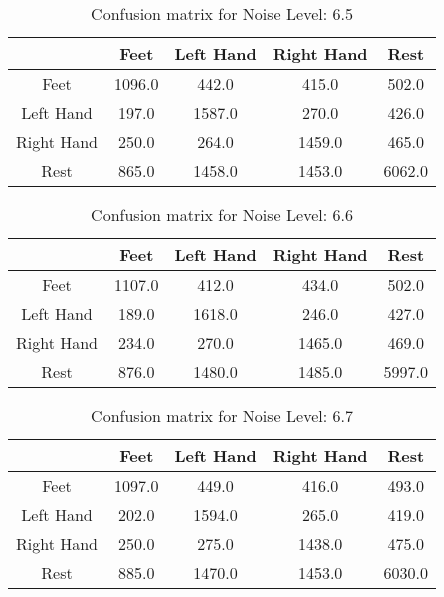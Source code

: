 \begin{table}[!htbp]
    \centering
    \begin{tabular}{|c||c|c|c|c|}
        \hline
		 & Feet & Left Hand & Right Hand & Rest \\
        \hline
        \hline
        Feet & 1096.0 & 442.0 & 415.0 & 502.0 \\
        \hline
        Left Hand & 197.0 & 1587.0 & 270.0 & 426.0 \\
        \hline
        Right Hand & 250.0 & 264.0 & 1459.0 & 465.0 \\
        \hline
        Rest & 865.0 & 1458.0 & 1453.0 & 6062.0 \\
        \hline
    \end{tabular}
    \caption{Confusion matrix for Noise Level: 6.5}
\end{table}

\begin{table}[!htbp]
    \centering
    \begin{tabular}{|c||c|c|c|c|}
        \hline
		 & Feet & Left Hand & Right Hand & Rest \\
        \hline
        \hline
        Feet & 1107.0 & 412.0 & 434.0 & 502.0 \\
        \hline
        Left Hand & 189.0 & 1618.0 & 246.0 & 427.0 \\
        \hline
        Right Hand & 234.0 & 270.0 & 1465.0 & 469.0 \\
        \hline
        Rest & 876.0 & 1480.0 & 1485.0 & 5997.0 \\
        \hline
    \end{tabular}
    \caption{Confusion matrix for Noise Level: 6.6}
\end{table}

\begin{table}[!htbp]
    \centering
    \begin{tabular}{|c||c|c|c|c|}
        \hline
		 & Feet & Left Hand & Right Hand & Rest \\
        \hline
        \hline
        Feet & 1097.0 & 449.0 & 416.0 & 493.0 \\
        \hline
        Left Hand & 202.0 & 1594.0 & 265.0 & 419.0 \\
        \hline
        Right Hand & 250.0 & 275.0 & 1438.0 & 475.0 \\
        \hline
        Rest & 885.0 & 1470.0 & 1453.0 & 6030.0 \\
        \hline
    \end{tabular}
    \caption{Confusion matrix for Noise Level: 6.7}
\end{table}

